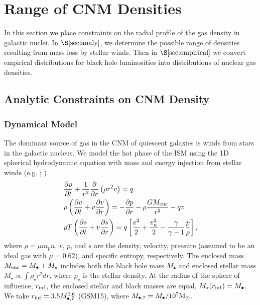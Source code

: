 \documentclass[usenatbib,fleqn]{mnras}
\newcommand{\Mbh}[1][]{M_{\bullet#1}}
\newcommand{\Menc}{M_{\rm enc}}
\newcommand{\Msun}{{\rm M_\odot}}
\begin{document}
\section{Range of CNM Densities}
\label{sec:cnm}

In this section we place constraints on the radial profile of the gas
density in galactic nuclei. In $\S\ref{sec:analy}$, we determine the possible range of
densities resulting from mass loss by stellar winds. Then in $\S\ref{sec:empirical}$ we convert
empirical distributions for black hole luminosities into distributions
of nuclear gas densities.

\subsection{Analytic Constraints on CNM Density}
\label{sec:analy}

\subsubsection{Dynamical Model}
\label{sec:model}

The dominant source of gas in the CNM of quiescent galaxies is winds
from stars in the galactic nucleus. We model the hot phase of the ISM
using the 1D spherical hydrodynamic equation with mass and energy
injection from stellar winds (e.g. \citealt{Holzer+1970};
\citealt{Quataert2004})
\begin{align}
  &\frac{\partial \rho}{\partial t}+\frac{1}{r^2}\frac{\partial}{\partial r}\left(\rho r^2 v\right)=q \label{eq:drhodt}\\
  &\rho \left(\frac{\partial v}{\partial t} + v\frac{\partial
      v}{\partial r}\right) =-\frac{\partial p}{\partial r}- \rho\frac{GM_{\rm enc}}{r^{2}} -q v \label{eq:dvdt}\\
  &\rho T\left(\frac{\partial s}{\partial t} + v\frac{\partial
      s}{\partial
      r}\right)=q\left[\frac{v^2}{2}+\frac{v_w^2}{2}-\frac{\gamma}{\gamma-1}
    \frac{p}{\rho} \right] ,
\label{eq:model}
\end{align}
where $\rho = \mu m_p n$, $v$, $p$, and $s$ are the density, velocity,
pressure (assumed to be an ideal gas with $\mu = 0.62$), and specific
entropy, respectively.  The enclosed mass $\Menc = M_{\bullet} +
M_{\star}$ includes both the black hole mass $M_{\bullet}$ and
enclosed stellar mass $M_{\star} \propto \int \rho_{\star}r^{2}dr$, where $\rho_{\star}$ is the stellar density. At
the radius of the sphere of influence, $r_{\rm inf}$, the enclosed stellar and black masses are equal, $M_{\star}(r_{\rm inf})=\Mbh$.  We take $r_{\rm inf}=3.5 \Mbh[,7]^{0.6}$ (GSM15), where $\Mbh[,7]=\Mbh/10^7
\Msun$.
\end{document}
